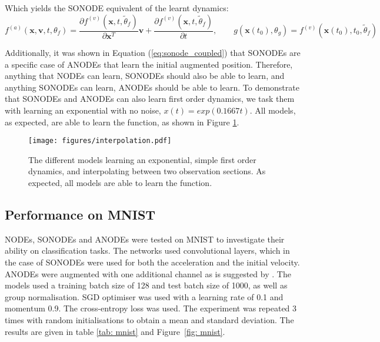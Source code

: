 \documentclass{article}
\theoremstyle{remark}
\theoremstyle{definition}
\begin{document}
Which yields the SONODE equivalent of the learnt dynamics:
\begin{equation}
    f^{(a)}(\mathbf{x}, \mathbf{v}, t, \theta_{f}) = \frac{\partial f^{(v)}(\mathbf{x}, t, \tilde{\theta}_{f})}{\partial \mathbf{x}^{T}}\mathbf{v}
    +
    \frac{\partial f^{(v)}(\mathbf{x}, t, \tilde{\theta}_{f})}{\partial t}
    ,\qquad
    g(\mathbf{x}(t_{0}), \theta_{g}) = f^{(v)}(\mathbf{x}(t_{0}), t_{0}, \tilde{\theta}_{f})
\end{equation}

Additionally, it was shown in Equation (\ref{eq:sonode_coupled}) that SONODEs are a specific case of ANODEs that learn the initial augmented position. Therefore, anything that NODEs can learn, SONODEs should also be able to learn, and anything SONODEs can learn, ANODEs should be able to learn. To demonstrate that SONODEs and ANODEs can also learn first order dynamics, we task them with learning an exponential with no noise, $x(t) = exp(0.1667t)$. All models, as expected, are able to learn the function, as shown in Figure \ref{fig: interp}.

\begin{figure}[h]
    \centering
    \texttt{[image: figures/interpolation.pdf]}
    \caption{The different models learning an exponential, simple first order dynamics, and interpolating between two observation sections. As expected, all models are able to learn the function.}
    \label{fig: interp}
\end{figure}


\subsection{Performance on MNIST}

\label{app: mnist}
NODEs, SONODEs and ANODEs were tested on MNIST \cite{lecun1998gradient} to investigate their ability on classification tasks. The networks used convolutional layers, which in the case of SONODEs were used for both the acceleration and the initial velocity. ANODEs were augmented with one additional channel as is suggested by \citet{dupont2019augmented}. The models used a training batch size of 128 and test batch size of 1000, as well as group normalisation. SGD optimiser was used with a learning rate of 0.1 and momentum 0.9. The cross-entropy loss was used. The experiment was repeated 3 times with random initialisations to obtain a mean and standard deviation. The results are given in table \ref{tab: mnist} and Figure~\ref{fig: mnist}.
\end{document}
